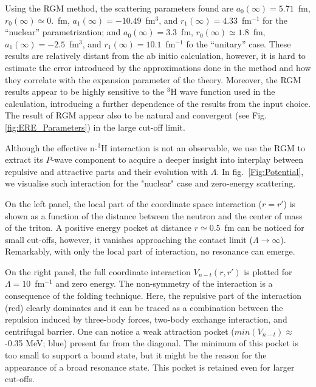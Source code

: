 \documentclass[5p,times]{elsarticle}
\begin{document}
%
Using the RGM method, the scattering parameters found are
$a_0(\infty) = 5.71$~fm, $r_0(\infty) \simeq 0.$~fm, $a_1(\infty) = -10.49$~fm$^3$, and $r_1(\infty) = 4.33$~fm$^{-1}$ for the ``nuclear'' parametrization; and
$a_0(\infty) = 3.3$~fm, $r_0(\infty) \simeq 1.8$~fm, $a_1(\infty) = -2.5$~fm$^3$, and $r_1(\infty) = 10.1$~fm$^{-1}$ fo the ``unitary'' case. 
These results are relatively distant from the ab initio calculation, however, it is hard to estimate the error introduced by the approximations done in the method and how they correlate with the expansion parameter of the theory.
Moreover, the RGM results appear to be highly sensitive to the $^3$H wave function used in the calculation, introducing a further dependence of the results from the input choice.
The result of RGM appear also to be natural and convergent (see Fig. \ref{fig:ERE_Parameters}) in the large cut-off limit.

%

%



%

%
\vspace{2mm}
%
Although the effective n-$^3$H interaction is not an observable, we use the RGM to extract its $P$-wave
component to acquire a deeper insight into interplay between repulsive and attractive parts and their evolution with $\Lambda$. In fig.~\ref{Fig:Potential}, we visualise such interaction for the "nuclear" case and zero-energy scattering.
%

%
On the left panel, the local part of the coordinate space interaction ($r=r'$) is shown as a function of the distance between the neutron and the center of mass of the triton. 
A positive energy pocket at distance $r\simeq0.5$~fm can be noticed for small cut-offs, however, it vanishes approaching the contact limit ($\Lambda\to\infty$). 
Remarkably, with only the local part of interaction, no resonance can emerge.
%

%
On the right panel, the full coordinate interaction $V_{n-t}(r,r')$ is plotted for $\Lambda=10$~fm$^{-1}$ and zero energy.
The non-symmetry of the interaction is a consequence of the folding technique. 
Here, the repulsive part of the interaction (red) clearly dominates and it can be traced as a combination between the repulsion induced by three-body forces, two-body exchange interaction, and centrifugal barrier. 
One can notice a weak attraction pocket ($min(V_{n-t})\approx$-0.35 MeV; blue) present far from the diagonal. 
The minimum of this pocket is too small to support a bound state, but it might be the reason for the appearance of a broad resonance state. This pocket is retained even for larger cut-offs. 
\end{document}
